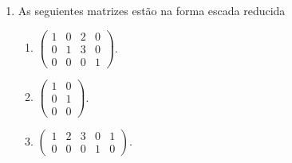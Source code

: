 \begin{example}
\begin{enumerate}
    \item As seguientes matrizes estão na forma escada reducida

          \begin{enumerate}
            \item

                  \begin{math}
                    \begin{pmatrix}
                      1 & 0 & 2 & 0 \\
                      0 & 1 & 3 & 0 \\
                      0 & 0 & 0 & 1
                    \end{pmatrix}
                  \end{math}.

            \item

                  \begin{math}
                    \begin{pmatrix}
                      1 & 0 \\
                      0 & 1 \\
                      0 & 0
                    \end{pmatrix}
                  \end{math}.


            \item

                  \begin{math}
                    \begin{pmatrix}
                      1 & 2 & 3 & 0 & 1 \\
                      0 & 0 & 0 & 1 & 0
                    \end{pmatrix}
                  \end{math}.
          \end{enumerate}

  \end{enumerate}
\end{example}

\begin{remark}

\end{remark}